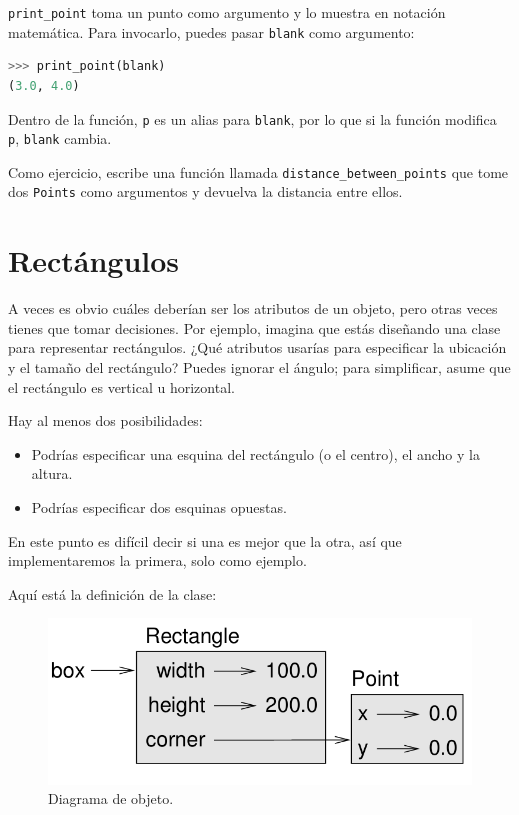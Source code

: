 \texttt{print\_point} toma un punto como argumento y lo muestra en notación matemática. Para invocarlo, puedes pasar \texttt{blank} como argumento:

\begin{lstlisting}[language=Python]
>>> print_point(blank)
(3.0, 4.0)
\end{lstlisting}

Dentro de la función, \texttt{p} es un alias para \texttt{blank}, por lo que si la función modifica \texttt{p}, \texttt{blank} cambia.

Como ejercicio, escribe una función llamada \texttt{distance\_between\_points} que tome dos \texttt{Points} como argumentos y devuelva la distancia entre ellos.

\section{Rectángulos}

A veces es obvio cuáles deberían ser los atributos de un objeto, pero otras veces tienes que tomar decisiones. Por ejemplo, imagina que estás diseñando una clase para representar rectángulos. ¿Qué atributos usarías para especificar la ubicación y el tamaño del rectángulo? Puedes ignorar el ángulo; para simplificar, asume que el rectángulo es vertical u horizontal.

Hay al menos dos posibilidades:

\begin{itemize}
    \item Podrías especificar una esquina del rectángulo (o el centro), el ancho y la altura.
    \item Podrías especificar dos esquinas opuestas.
\end{itemize}

En este punto es difícil decir si una es mejor que la otra, así que implementaremos la primera, solo como ejemplo.

Aquí está la definición de la clase:

\begin{figure}[h]
\centering
\includegraphics[width=0.7\linewidth]{images/chapter_15_2.png} %
\caption{Diagrama de objeto.}
\label{fig:diagrama_estado}
\end{figure}

